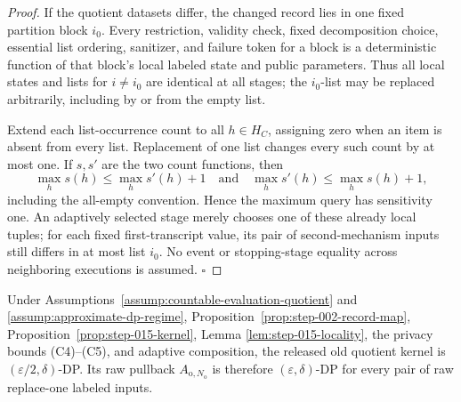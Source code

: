 \begin{proof}
If the quotient datasets differ, the changed record lies in one fixed
partition block \(i_0\). Every restriction, validity check, fixed
decomposition choice, essential list ordering, sanitizer, and failure token
for a block is a deterministic function of that block's local labeled
state and public parameters. Thus all local states and lists for
\(i\ne i_0\) are identical at all stages; the \(i_0\)-list may be
replaced arbitrarily, including by or from the empty list.

Extend each list-occurrence count to all \(h\in H_C\), assigning zero when
an item is absent from every list. Replacement of one list changes every
such count by at most one. If \(s,s'\) are the two count functions, then
\[
\max_hs(h)\le\max_hs'(h)+1
\quad\text{and}\quad
\max_hs'(h)\le\max_hs(h)+1,
\]
including the all-empty convention. Hence the maximum query has
sensitivity one. An adaptively selected stage merely chooses one of these
already local tuples; for each fixed first-transcript value, its pair of
second-mechanism inputs still differs in at most list \(i_0\). No event or
stopping-stage equality across neighboring executions is assumed.
\(\square\)


\end{proof}

\begin{proposition}\label{prop:step-015-dp}
Under Assumptions~\ref{assump:countable-evaluation-quotient} and
\ref{assump:approximate-dp-regime}, Proposition~\ref{prop:step-002-record-map},
Proposition~\ref{prop:step-015-kernel}, Lemma
\ref{lem:step-015-locality}, the privacy bounds (C4)--(C5),
and adaptive composition, the released old quotient kernel is
\((\varepsilon/2,\delta)\)-DP. Its raw pullback
\(A_{\mathrm o,N_{\mathrm o}}\) is therefore
\((\varepsilon,\delta)\)-DP for every pair of raw replace-one labeled
inputs.


\end{proposition}

